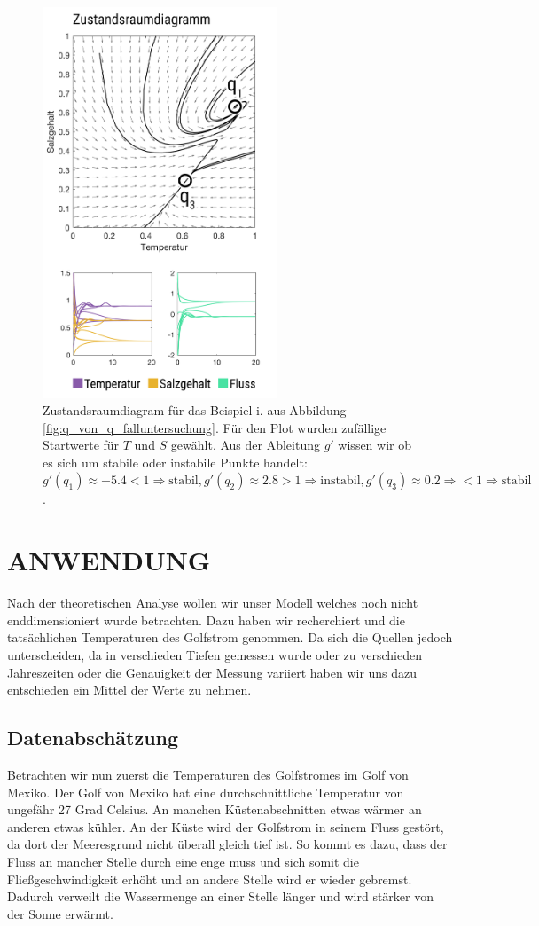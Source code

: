 \documentclass[a4paper,twoside]{article}
\begin{document}
	\begin{figure}[!h]
  		\centering
 		\includegraphics[width=7cm]{../Diagramme/zustandsdiagram.png}
  		\caption{Zustandsraumdiagram für das Beispiel i. aus Abbildung \ref{fig:q_von_q_falluntersuchung}. Für den Plot wurden zufällige Startwerte für \(T\) und \(S\) gewählt. Aus der Ableitung \(g'\) wissen wir ob es sich um stabile oder instabile Punkte handelt: \(g'(q_1) \approx -5.4 < 1 \Rightarrow \textrm{stabil}, g'(q_2) \approx 2.8 > 1 \Rightarrow \textrm{instabil}, g'(q_3) \approx 0.2 \Rightarrow < 1 \Rightarrow \textrm{stabil} \). }
  		\label{fig:Zustandsraumdiagram}
	\end{figure}	
	
	\section{\uppercase{Anwendung}}\label{sec:Anwendung}
	\noindent Nach der theoretischen Analyse wollen wir unser Modell welches noch nicht enddimensioniert wurde betrachten. Dazu haben wir recherchiert und die tatsächlichen Temperaturen des Golfstrom genommen. Da sich die Quellen jedoch unterscheiden, da in verschieden Tiefen gemessen wurde oder zu verschieden Jahreszeiten oder die Genauigkeit der Messung variiert haben wir uns dazu entschieden ein Mittel der Werte zu nehmen.
	
	\subsection{Datenabschätzung} \label{Datenabschaetzung}
	\noindent Betrachten wir nun zuerst die Temperaturen des Golfstromes im Golf von Mexiko. Der Golf von Mexiko hat eine durchschnittliche Temperatur von ungefähr 27 Grad Celsius. An manchen Küstenabschnitten etwas wärmer an anderen etwas kühler. An der Küste wird der Golfstrom in seinem Fluss gestört, da dort der Meeresgrund nicht überall gleich tief ist. So kommt es dazu, dass der Fluss an mancher Stelle durch eine enge muss und sich somit die Fließgeschwindigkeit erhöht und an andere Stelle wird er wieder gebremst. Dadurch verweilt die Wassermenge an einer Stelle länger und wird stärker von der Sonne erwärmt. 
	
\end{document}
